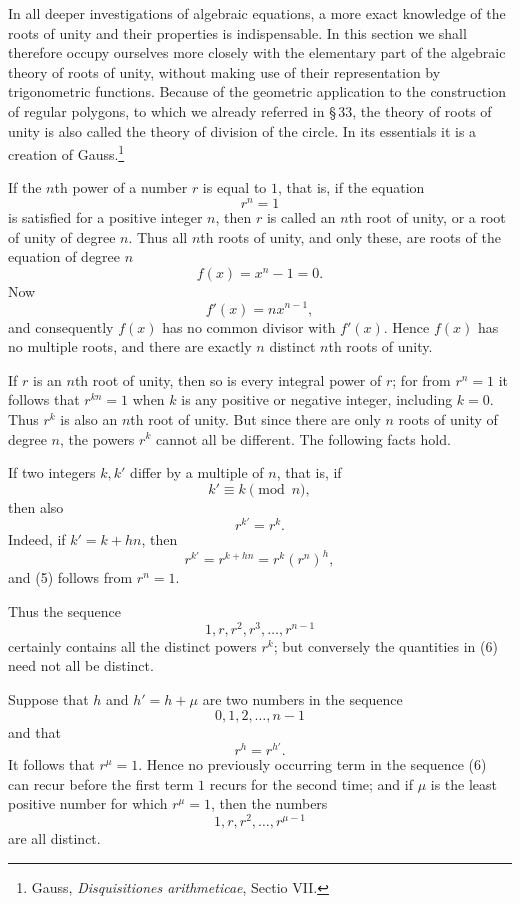\documentclass[11pt]{article}
\begin{document}
In all deeper investigations of algebraic equations, a more exact knowledge of the roots of unity and their properties is indispensable. In this section we shall therefore occupy ourselves more closely with the elementary part of the algebraic theory of roots of unity, without making use of their representation by trigonometric functions. Because of the geometric application to the construction of regular polygons, to which we already referred in \S\,33, the theory of roots of unity is also called the theory of division of the circle. In its essentials it is a creation of Gauss.\footnote{Gauss, \emph{Disquisitiones arithmeticae}, Sectio VII.}

If the $n$th power of a number $r$ is equal to $1$, that is, if the equation
\[
\tag{1}        r^n=1
\]
is satisfied for a positive integer $n$, then $r$ is called an $n$th root of unity, or a root of unity of degree $n$. Thus all $n$th roots of unity, and only these, are roots of the equation of degree $n$
\[
\tag{2}        f(x)=x^n-1=0.
\]
Now
\[
\tag{3}        f'(x)=n x^{n-1},
\]
and consequently $f(x)$ has no common divisor with $f'(x)$. Hence $f(x)$ has no multiple roots, and there are exactly $n$ distinct $n$th roots of unity.

If $r$ is an $n$th root of unity, then so is every integral power of $r$; for from $r^n=1$ it follows that $r^{kn}=1$ when $k$ is any positive or negative integer, including $k=0$. Thus $r^k$ is also an $n$th root of unity. But since there are only $n$ roots of unity of degree $n$, the powers $r^k$ cannot all be different. The following facts hold.

If two integers $k,k'$ differ by a multiple of $n$, that is, if
\[
\tag{4}        k'\equiv k \pmod n,
\]
then also
\[
\tag{5}        r^{k'}=r^k.
\]
Indeed, if $k'=k+hn$, then
\[
        r^{k'}=r^{k+hn}=r^k(r^n)^h,
\]
and (5) follows from $r^n=1$.

Thus the sequence
\[
\tag{6}        1,r,r^2,r^3,\ldots,r^{n-1}
\]
certainly contains all the distinct powers $r^k$; but conversely the quantities in (6) need not all be distinct.

Suppose that $h$ and $h'=h+\mu$ are two numbers in the sequence
\[
        0,1,2,\ldots,n-1
\]
and that
\[
        r^h=r^{h'}.
\]
It follows that $r^\mu=1$. Hence no previously occurring term in the sequence (6) can recur before the first term $1$ recurs for the second time; and if $\mu$ is the least positive number for which $r^\mu=1$, then the numbers
\[
\tag{7}        1,r,r^2,\ldots,r^{\mu-1}
\]
are all distinct.
\end{document}
